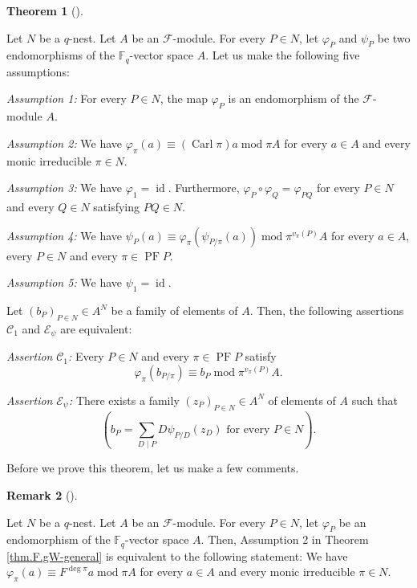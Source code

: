 \documentclass[numbers=enddot,12pt,final,onecolumn,notitlepage]{scrartcl}%
\theoremstyle{definition}
\newtheorem{theo}{Theorem}[section]
\newenvironment{theorem}[1][]
{\begin{theo}[#1]\begin{leftbar}}
{\end{leftbar}\end{theo}}
\newtheorem{remk}[theo]{Remark}
\newenvironment{remark}[1][]
{\begin{remk}[#1]\begin{leftbar}}
{\end{leftbar}\end{remk}}
\let\sumnonlimits\sum
\renewcommand{\sum}{\sumnonlimits\limits}
\begin{document}
\begin{theorem}
\label{thm.F.gW-general}Let $N$ be a $q$-nest. Let $A$ be an $\mathcal{F}%
$-module. For every $P\in N$, let $\varphi_{P}$ and $\psi_{P}$ be two
endomorphisms of the $\mathbb{F}_{q}$-vector space $A$. Let us make the
following five assumptions:

\textit{Assumption 1:} For every $P\in N$, the map $\varphi_{P}$ is an
endomorphism of the $\mathcal{F}$-module $A$.

\textit{Assumption 2:} We have $\varphi_{\pi}\left(  a\right)  \equiv\left(
\operatorname*{Carl}\pi\right)  a\operatorname{mod}\pi A$ for every $a\in A$
and every monic irreducible $\pi\in N$.

\textit{Assumption 3:} We have $\varphi_{1}=\operatorname*{id}$. Furthermore,
$\varphi_{P}\circ\varphi_{Q}=\varphi_{PQ}$ for every $P\in N$ and every $Q\in
N$ satisfying $PQ\in N$.

\textit{Assumption 4:} We have $\psi_{P}\left(  a\right)  \equiv\varphi_{\pi
}\left(  \psi_{P/\pi}\left(  a\right)  \right)  \operatorname{mod}\pi^{v_{\pi
}\left(  P\right)  }A$ for every $a\in A$, every $P\in N$ and every $\pi
\in\operatorname*{PF}P$.

\textit{Assumption 5:} We have $\psi_{1}=\operatorname*{id}$.

Let $\left(  b_{P}\right)  _{P\in N}\in A^{N}$ be a family of elements of $A$.
Then, the following assertions $\mathcal{C}_{1}$ and $\mathcal{E}_{\psi}$ are equivalent:

\textit{Assertion }$\mathcal{C}_{1}$\textit{:} Every $P\in N$ and every
$\pi\in\operatorname{PF}P$ satisfy%
\[
\varphi_{\pi}\left(  b_{P / \pi}\right)  \equiv b_{P}\operatorname{mod}%
\pi^{v_{\pi}\left(  P\right)  }A.
\]


\textit{Assertion }$\mathcal{E}_{\psi}$\textit{:} There exists a family
$\left(  z_{P}\right)  _{P\in N}\in A^{N}$ of elements of $A$ such that%
\[
\left(  b_{P}=\sum_{D\mid P}D\psi_{P / D}\left(  z_{D}\right)  \text{ for
every }P\in N\right)  .
\]

\end{theorem}

Before we prove this theorem, let us make a few comments.

\begin{remark}
\label{rmk.F.gW-general.ass2}Let $N$ be a $q$-nest. Let $A$ be an
$\mathcal{F}$-module. For every $P\in N$, let $\varphi_{P}$ be an endomorphism
of the $\mathbb{F}_{q}$-vector space $A$. Then, Assumption 2 in Theorem
\ref{thm.F.gW-general} is equivalent to the following statement: We have
$\varphi_{\pi}\left(  a\right)  \equiv F^{\deg\pi}a\operatorname{mod}\pi A$
for every $a\in A$ and every monic irreducible $\pi\in N$.
\end{remark}
\end{document}
